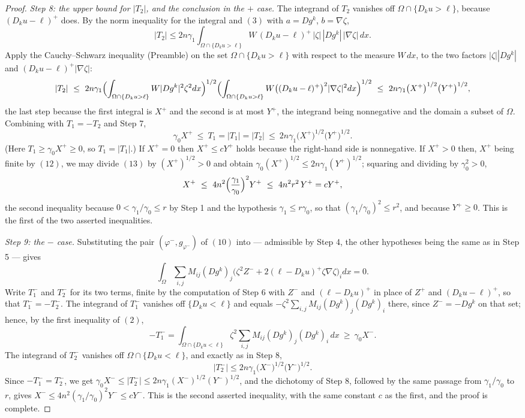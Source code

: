 \begin{proof}
\emph{Step 8: the upper bound for $|T_2|$, and the conclusion in the $+$ case.}
The integrand of $T_2$ vanishes off $\Omega\cap\{D_ku>\ell\}$, because
$(D_ku-\ell)^{+}$ does.  By the norm inequality for the integral and $(3)$ with
$a=Dg^k$, $b=\nabla\zeta$,
\[
|T_2|\le2n\gamma_1\int_{\Omega\cap\{D_ku>\ell\}}
W\,(D_ku-\ell)^{+}\,|\zeta|\,|Dg^k|\,|\nabla\zeta|\,dx .
\]
Apply the Cauchy--Schwarz inequality (Preamble) on the set
$\Omega\cap\{D_ku>\ell\}$ with respect to the measure $W\,dx$, to the two
factors $|\zeta||Dg^k|$ and $(D_ku-\ell)^{+}|\nabla\zeta|$:
\[
|T_2|\ \le\ 2n\gamma_1
\Bigl(\int_{\Omega\cap\{D_ku>\ell\}}W|Dg^k|^2\zeta^2dx\Bigr)^{1/2}
\Bigl(\int_{\Omega\cap\{D_ku>\ell\}}W\bigl((D_ku-\ell)^{+}\bigr)^2|\nabla\zeta|^2dx\Bigr)^{1/2}
\ \le\ 2n\gamma_1\bigl(X^{+}\bigr)^{1/2}\bigl(Y^{+}\bigr)^{1/2},
\]
the last step because the first integral is $X^{+}$ and the second is at most
$Y^{+}$, the integrand being nonnegative and the domain a subset of $\Omega$.
Combining with $T_1=-T_2$ and Step 7,
\[
\gamma_0X^{+}\ \le\ T_1=|T_1|=|T_2|\ \le\ 2n\gamma_1\bigl(X^{+}\bigr)^{1/2}\bigl(Y^{+}\bigr)^{1/2} .
\tag{13}
\]
(Here $T_1\ge\gamma_0X^{+}\ge0$, so $T_1=|T_1|$.)  If $X^{+}=0$ then
$X^{+}\le cY^{+}$ holds because the right-hand side is nonnegative.  If
$X^{+}>0$ then, $X^{+}$ being finite by $(12)$, we may divide $(13)$ by
$(X^{+})^{1/2}>0$ and obtain
$\gamma_0(X^{+})^{1/2}\le2n\gamma_1(Y^{+})^{1/2}$; squaring and dividing by
$\gamma_0^2>0$,
\[
X^{+}\ \le\ 4n^2\Bigl(\frac{\gamma_1}{\gamma_0}\Bigr)^2Y^{+}
\ \le\ 4n^2r^2\,Y^{+}=cY^{+} ,
\]
the second inequality because $0<\gamma_1/\gamma_0\le r$ by Step 1 and the
hypothesis $\gamma_1\le r\gamma_0$, so that
$(\gamma_1/\gamma_0)^2\le r^2$, and because $Y^{+}\ge0$.  This is the first of
the two asserted inequalities.

\emph{Step 9: the $-$ case.}  Substituting the pair $(\varphi^{-},g_{\varphi^{-}})$
of $(10)$ into  --- admissible by Step 4, the
other hypotheses being the same as in Step 5 --- gives
\[
\int_\Omega\sum_{i,j}M_{ij}(Dg^k)_j\bigl(\zeta^2Z^{-}+2(\ell-D_ku)^{+}\zeta\nabla\zeta\bigr)_i dx=0 .
\]
Write $T_1^{-}$ and $T_2^{-}$ for its two terms, finite by the computation of
Step 6 with $Z^{-}$ and $(\ell-D_ku)^{+}$ in place of $Z^{+}$ and
$(D_ku-\ell)^{+}$, so that $T_1^{-}=-T_2^{-}$.  The integrand of $T_1^{-}$
vanishes off $\{D_ku<\ell\}$ and equals
$-\zeta^2\sum_{i,j}M_{ij}(Dg^k)_j(Dg^k)_i$ there, since $Z^{-}=-Dg^k$ on that
set; hence, by the first inequality of $(2)$,
\[
-T_1^{-}=\int_{\Omega\cap\{D_ku<\ell\}}\zeta^2\sum_{i,j}M_{ij}(Dg^k)_j(Dg^k)_i\,dx
\ \ge\ \gamma_0X^{-} .
\]
The integrand of $T_2^{-}$ vanishes off $\Omega\cap\{D_ku<\ell\}$, and exactly
as in Step 8,
\[
|T_2^{-}|\le2n\gamma_1\bigl(X^{-}\bigr)^{1/2}\bigl(Y^{-}\bigr)^{1/2} .
\]
Since $-T_1^{-}=T_2^{-}$, we get
$\gamma_0X^{-}\le|T_2^{-}|\le2n\gamma_1(X^{-})^{1/2}(Y^{-})^{1/2}$, and the
dichotomy of Step 8, followed by the same passage from $\gamma_1/\gamma_0$ to
$r$, gives
$X^{-}\le4n^2(\gamma_1/\gamma_0)^2Y^{-}\le cY^{-}$.  This is the second
asserted inequality, with the same constant $c$ as the first, and the proof is
complete.
\end{proof}
